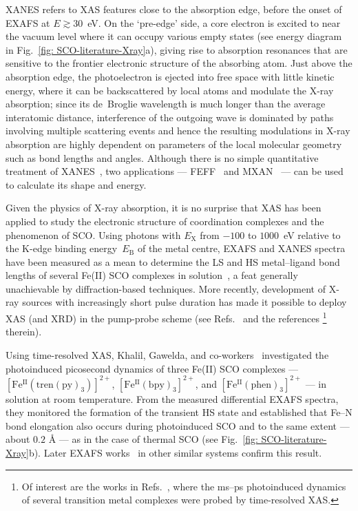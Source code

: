 XANES refers to XAS features close to the absorption edge,
before the onset of EXAFS at $E \gtrsim 30$~eV.
%
On the `pre-edge' side, a core electron is excited to near the vacuum level
where it can occupy various empty states
(see energy diagram in Fig.~\ref{fig: SCO-literature-Xray}a),
giving rise to absorption resonances that are sensitive to
the frontier electronic structure of the absorbing atom.
%
Just above the absorption edge,
the photoelectron is ejected into free space with little kinetic energy,
where it can be backscattered by local atoms and modulate the X-ray absorption;
since its de~Broglie wavelength is much longer than the average interatomic distance,
interference of the outgoing wave is dominated by paths involving multiple scattering events
and hence the resulting modulations in X-ray absorption are highly dependent on
parameters of the local molecular geometry such as bond lengths and angles.
%
Although there is no simple quantitative treatment of XANES~\cite{Ankudinov1999, Rehr2000},
two applications --- \textsc{FEFF}~\cite{Rehr2010} and \textsc{MXAN}~\cite{Benfatto2001} ---
can be used to calculate its shape and energy.

Given the physics of X-ray absorption, it is no surprise that XAS has been applied to study
the electronic structure of coordination complexes and the phenomenon of SCO.
Using photons with $E_\text{X}$ from $-100$ to $1000$~eV relative to
the K-edge binding energy~$E_\text{B}$ of the metal centre,
EXAFS and XANES spectra have been measured as a mean to determine
the LS and HS metal--ligand bond lengths of several Fe(II) SCO complexes
in solution~\cite{Chen1995, Hannay1997, Erenburg1999, Lee2000, Boca2000},
a feat generally unachievable by diffraction-based techniques.
%
More recently, development of X-ray sources with increasingly short pulse duration
has made it possible to deploy XAS (and XRD) in the pump-probe scheme
(see Refs.~\cite{Bressler2004, Chen2005} and the references%
\footnote{Of interest are the works in Refs.~\cite{Mills1984, Thiel1993,
Chen2001, Chen2002, Saes2003, Gawelda2005, Veen2009},
where the ms--ps photoinduced dynamics of several transition metal complexes
were probed by time-resolved XAS.} therein).

Using time-resolved XAS,
Khalil, Gawelda, and co-workers~\cite{Khalil2006, Gawelda2007b}
investigated the photoinduced picosecond dynamics of three Fe(II) SCO complexes ---
$\mathrm{[Fe^{II}(tren(py)_3)]^{2+}}$, $\mathrm{[Fe^{II}(bpy)_3]^{2+}}$, and  $\mathrm{[Fe^{II}(phen)_3]^{2+}}$ --- in solution at room temperature.
From the measured differential EXAFS spectra,
they monitored the formation of the transient HS state and established that
Fe--N bond elongation also occurs during photoinduced SCO and
to the same extent --- about $0.2$ \AA{} --- as in the case of thermal SCO
(see Fig.~\ref{fig: SCO-literature-Xray}b).
Later EXAFS works~\cite{Sato2009, Nozawa2010, Canton2014, XZhang2015, Vanko2015}
in other similar systems confirm this result.

